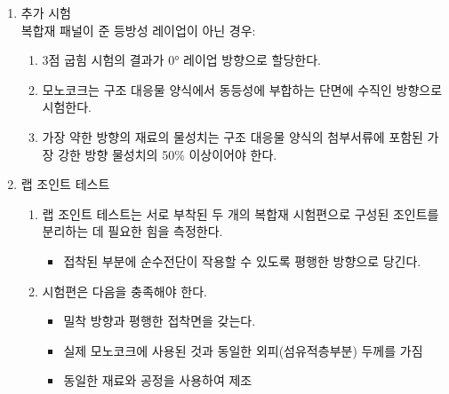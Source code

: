 \documentclass[final,a4paper,10pt]{report}
\begin{document}
\begin{enumerate}
\begin{enumerate}
      \item\label{rule:formula-technical.alternative-materials.testing.non-isotropic-panels} 추가 시험\\
        복합재 패널이 준 등방성 레이업이 아닌 경우:
        \begin{enumerate}
          \item\label{rule:formula-technical.alternative-materials.testing.non-isotropic-panels.zero-degree-bend-assignment} 3점 굽힘 시험의 결과가 0° 레이업 방향으로 할당한다.
          \item\label{rule:formula-technical.alternative-materials.testing.non-isotropic-panels.perpendicular-direction} 모노코크는 구조 대응물 양식에서 동등성에 부합하는 단면에 수직인 방향으로 시험한다.
          \item\label{rule:formula-technical.alternative-materials.testing.non-isotropic-panels.weakest-direction-50pct} 가장 약한 방향의 재료의 물성치는 구조 대응물 양식의 첨부서류에 포함된 가장 강한 방향 물성치의 50\% 이상이어야 한다.
        \end{enumerate}

      \item\label{rule:formula-technical.alternative-materials.testing.lap-joint-test} 랩 조인트 테스트
        \begin{enumerate}
          \item\label{rule:formula-technical.alternative-materials.testing.lap-joint-test.bond-separation-force} 랩 조인트 테스트는 서로 부착된 두 개의 복합재 시험편으로 구성된 조인트를 분리하는 데 필요한 힘을 측정한다.
            \begin{itemize}
                \item 접착된 부분에 순수전단이 작용할 수 있도록 평행한 방향으로 당긴다.
            \end{itemize}

          \item\label{rule:formula-technical.alternative-materials.testing.lap-joint-test.specimen-bond-orientation} 시험편은 다음을 충족해야 한다.
            \begin{itemize}
                \item 밀착 방향과 평행한 접착면을 갖는다.
                \item 실제 모노코크에 사용된 것과 동일한 외피(섬유적층부분) 두께를 가짐
                \item 동일한 재료와 공정을 사용하여 제조
            \end{itemize}


\end{enumerate}
\end{enumerate}
\end{enumerate}
\end{document}

